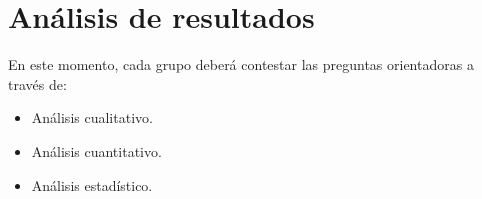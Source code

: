 \section{Análisis de resultados}

En este momento, cada grupo deberá contestar las preguntas orientadoras a través
de:
\begin{itemize}
	\item Análisis cualitativo.
	\item Análisis cuantitativo.
	\item Análisis estadístico.
\end{itemize}
